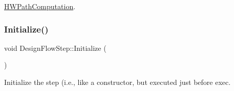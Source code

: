 \hyperlink{classHWPathComputation_a0a9a812ed694880508c509a63c03fb26}{H\+W\+Path\+Computation}.

\mbox{\label{classDesignFlowStep_a44b50683382a094976e1d432a7784799}} 
\subsubsection{\texorpdfstring{Initialize()}{Initialize()}}
{\footnotesize\ttfamily void Design\+Flow\+Step\+::\+Initialize (\begin{DoxyParamCaption}{ }\end{DoxyParamCaption})\hspace{0.3cm}{\ttfamily [virtual]}}



Initialize the step (i.\+e., like a constructor, but executed just before exec. 



